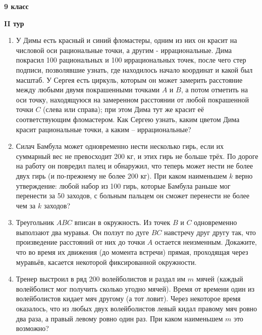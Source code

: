 \documentclass{article}
\begin{document}
    \large

    \begin{center}
        \LARGE\textbf{9 класс}
    \end{center}
    \begin{center}
        \large\textbf{II тур}
    \end{center}

    \begin{enumerate}[label*=\textbf{\arabic{enumi}.}]
        \setcounter{enumi}{0}
        \item У Димы есть красный и синий фломастеры, одним из них он красит на числовой оси рациональные точки, а другим - иррациональные.
        Дима покрасил 100 рациональных и 100 иррациональных точек, после чего стер подписи, позволявшие узнать, где находилось начало координат и какой был масштаб.
        У Сергея есть циркуль, которым он может замерить расстояние между любыми двумя покрашенными точками $A$ и $B$, а потом отметить на оси точку, находящуюся на замеренном расстоянии от любой покрашенной точки $C$ (слева или справа); при этом Дима тут же красит её соответствующим фломастером.
        Как Сергею узнать, каким цветом Дима красит рациональные точки, а каким -- иррациональные?

        \item Силач Бамбула может одновременно нести несколько гирь, если их суммарный вес не превосходит 200 кг, и этих гирь не больше трёх.
        По дороге на работу он повредил палец и обнаружил, что теперь может нести не более двух гирь (и по-прежнему не более 200 кг).
        При каком наименьшем $k$ верно утверждение: любой набор из 100 гирь, которые Бамбула раньше мог перенести за 50 заходов, с больным пальцем он сможет перенести не более чем за $k$ заходов?

        \item Треугольник $ABC$ вписан в окружность.
        Из точек $B$ и $C$ одновременно выползают два муравья.
        Он ползут по дуге $BC$ навстречу друг другу так, что произведение расстояний от них до точки $A$ остается неизменным.
        Докажите, что во время их движения (до момента встречи) прямая, проходящая через муравьёв, касается некоторой фиксированной окружности.

        \item Тренер выстроил в ряд 200 волейболистов и раздал им $m$ мячей (каждый волейболист мог получить сколько угодно мячей).
        Время от времени один из волейболистов кидает мяч другому (а тот ловит).
        Через некоторое время оказалось, что из любых двух волейболистов левый кидал правому мяч ровно два раза, а правый левому ровно один раз.
        При каком наименьшем $m$ это возможно?


\end{enumerate}
\end{document}
